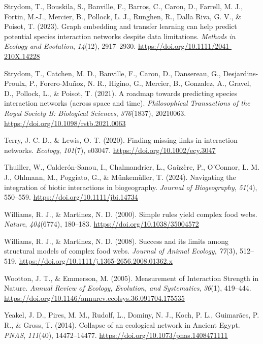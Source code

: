 \documentclass[
]{article}
\newlength{\cslhangindent}
\newenvironment{CSLReferences}[2] %
 {\begin{list}{}{%
  \setlength{\itemindent}{0pt}
  \setlength{\leftmargin}{0pt}
  \setlength{\parsep}{0pt}
  \ifodd #1
   \setlength{\leftmargin}{\cslhangindent}
   \setlength{\itemindent}{-1\cslhangindent}
  \fi
  \setlength{\itemsep}{#2\baselineskip}}}
 {\end{list}}
\begin{document}
\begin{CSLReferences}{1}{0}
Strydom, T., Bouskila, S., Banville, F., Barros, C., Caron, D., Farrell,
M. J., Fortin, M.-J., Mercier, B., Pollock, L. J., Runghen, R., Dalla
Riva, G. V., \& Poisot, T. (2023). Graph embedding and transfer learning
can help predict potential species interaction networks despite data
limitations. \emph{Methods in Ecology and Evolution}, \emph{14}(12),
2917--2930. \url{https://doi.org/10.1111/2041-210X.14228}

Strydom, T., Catchen, M. D., Banville, F., Caron, D., Dansereau, G.,
Desjardins-Proulx, P., Forero-Muñoz, N. R., Higino, G., Mercier, B.,
Gonzalez, A., Gravel, D., Pollock, L., \& Poisot, T. (2021). A roadmap
towards predicting species interaction networks (across space and time).
\emph{Philosophical Transactions of the Royal Society B: Biological
Sciences}, \emph{376}(1837), 20210063.
\url{https://doi.org/10.1098/rstb.2021.0063}

Terry, J. C. D., \& Lewis, O. T. (2020). Finding missing links in
interaction networks. \emph{Ecology}, \emph{101}(7), e03047.
\url{https://doi.org/10.1002/ecy.3047}

Thuiller, W., Calderón-Sanou, I., Chalmandrier, L., Gaüzère, P.,
O'Connor, L. M. J., Ohlmann, M., Poggiato, G., \& Münkemüller, T.
(2024). Navigating the integration of biotic interactions in
biogeography. \emph{Journal of Biogeography}, \emph{51}(4), 550--559.
\url{https://doi.org/10.1111/jbi.14734}

Williams, R. J., \& Martinez, N. D. (2000). Simple rules yield complex
food webs. \emph{Nature}, \emph{404}(6774), 180--183.
\url{https://doi.org/10.1038/35004572}

Williams, R. J., \& Martinez, N. D. (2008). Success and its limits among
structural models of complex food webs. \emph{Journal of Animal
Ecology}, \emph{77}(3), 512--519.
\url{https://doi.org/10.1111/j.1365-2656.2008.01362.x}

Wootton, J. T., \& Emmerson, M. (2005). Measurement of {Interaction
Strength} in {Nature}. \emph{Annual Review of Ecology, Evolution, and
Systematics}, \emph{36}(1), 419--444.
\url{https://doi.org/10.1146/annurev.ecolsys.36.091704.175535}

Yeakel, J. D., Pires, M. M., Rudolf, L., Dominy, N. J., Koch, P. L.,
Guimarães, P. R., \& Gross, T. (2014). Collapse of an ecological network
in {Ancient Egypt}. \emph{PNAS}, \emph{111}(40), 14472--14477.
\url{https://doi.org/10.1073/pnas.1408471111}

\end{CSLReferences}
\end{document}
